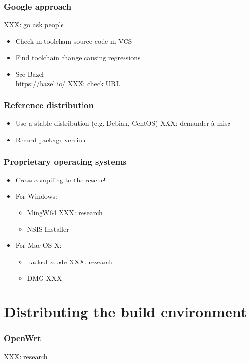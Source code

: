 \documentclass[14pt,ignorenonframetext]{beamer}
\begin{document}
\begin{frame}
 \frametitle{Google approach}

 XXX: go ask people

 \begin{itemize}
  \item Check-in toolchain source code in VCS
  \item Find toolchain change causing regressions
  \item See Bazel \\
   \url{https://bazel.io/} XXX: check URL
 \end{itemize}
\end{frame}

\begin{frame}
 \frametitle{Reference distribution}

 \begin{itemize}
  \item Use a stable distribution (e.g. Debian, CentOS) XXX: demander à misc
  \item Record package version
 \end{itemize}
\end{frame}

\begin{frame}
 \frametitle{Proprietary operating systems}

 \begin{itemize}
  \item Cross-compiling to the rescue!
  \item For Windows:
   \begin{itemize}
     \item MingW64 XXX: research
     \item NSIS Installer
   \end{itemize}
  \item For Mac OS X:
   \begin{itemize}
     \item hacked xcode XXX: research
     \item DMG XXX
   \end{itemize}
 \end{itemize}
\end{frame}

\section{Distributing the build environment}

\begin{frame}
 \frametitle{OpenWrt}

 XXX: research
\end{frame}
\end{document}
